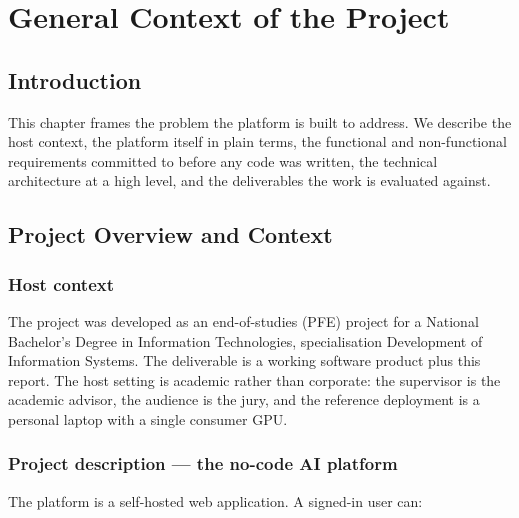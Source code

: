 \documentclass[12pt, a4paper, oneside]{report}
\begin{document}
\newpage

\chapter{General Context of the Project}

\section*{Introduction}

This chapter frames the problem the platform is built to address. We
describe the host context, the platform itself in plain terms, the
functional and non-functional requirements committed to before any
code was written, the technical architecture at a high level, and the
deliverables the work is evaluated against.

\section{Project Overview and Context}

\subsection{Host context}

The project was developed as an end-of-studies (PFE) project for a
National Bachelor's Degree in Information Technologies, specialisation
Development of Information Systems. The deliverable is a working
software product plus this report. The host setting is academic
rather than corporate: the supervisor is the academic advisor, the
audience is the jury, and the reference deployment is a personal
laptop with a single consumer GPU.

\subsection{Project description --- the no-code AI platform}

The platform is a self-hosted web application. A signed-in user can:
\end{document}
